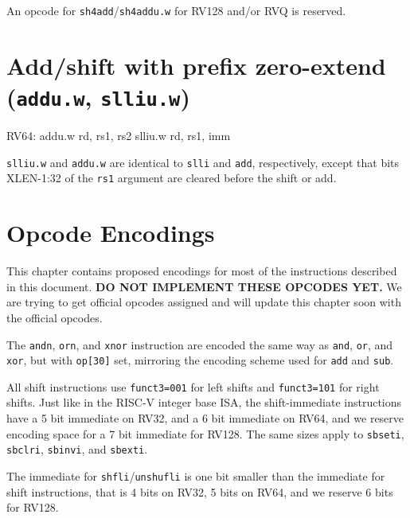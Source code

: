 

An opcode for {\tt sh4add}/{\tt sh4addu.w} for RV128 and/or RVQ is reserved.


\section{Add/shift with prefix zero-extend ({\tt addu.w}, {\tt slliu.w})}

\begin{rvb}
  RV64:
    addu.w rd, rs1, rs2
    slliu.w rd, rs1, imm
\end{rvb}

{\tt slliu.w} and {\tt addu.w} are identical to {\tt slli} and {\tt add}, respectively,
except that bits XLEN-1:32 of the {\tt rs1} argument are cleared before the shift or add.





\section{Opcode Encodings}
\label{opcodes}

This chapter contains proposed encodings for most of the instructions described
in this document. {\bf DO NOT IMPLEMENT THESE OPCODES YET.} We are trying to get
official opcodes assigned and will update this chapter soon with the official
opcodes.

The {\tt andn}, {\tt orn}, and {\tt xnor} instruction are encoded the same way
as {\tt and}, {\tt or}, and {\tt xor}, but with {\tt op[30]} set, mirroring the
encoding scheme used for {\tt add} and {\tt sub}.

All shift instructions use {\tt funct3=001} for left shifts and {\tt funct3=101}
for right shifts. Just like in the RISC-V integer base ISA, the shift-immediate
instructions have a 5 bit immediate on RV32, and a 6 bit immediate on RV64, and we
reserve encoding space for a 7 bit immediate for RV128.  The same sizes apply
to {\tt sbseti}, {\tt sbclri}, {\tt sbinvi}, and {\tt sbexti}.

The immediate for {\tt shfli}/{\tt unshufli} is one bit smaller than the immediate
for shift instructions, that is 4 bits on RV32, 5 bits on RV64, and we reserve 6
bits for RV128.

